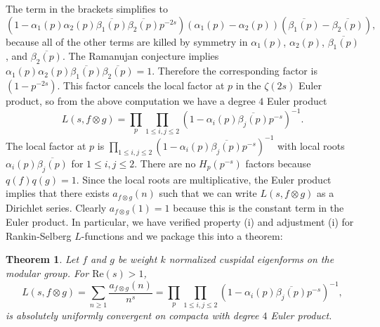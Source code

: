 \documentclass[12pt]{book}
\newtheorem{theorem}{Theorem}[section]
\theoremstyle{definition}\newframedtheorem{method}{Method}
\renewcommand{\a}{\alpha}
\renewcommand{\b}{\beta}
\newcommand{\z}{\zeta}
\newcommand{\ox}{\otimes}
\newcommand{\<}{\langle}
\renewcommand{\>}{\rangle}
\newcommand{\conj}{\overline}
\renewcommand{\Re}{\mathrm{Re}}
\begin{document}
      \endgroup
      The term in the brackets simplifies to
      \[
        (1-\a_{1}(p)\a_{2}(p)\conj{\b_{1}(p)}\conj{\b_{2}(p)}p^{-2s})(\a_{1}(p)-\a_{2}(p))(\conj{\b_{1}(p)}-\conj{\b_{2}(p)}),
      \]
      because all of the other terms are killed by symmetry in $\a_{1}(p)$, $\a_{2}(p)$, $\conj{\b_{1}(p)}$, and $\conj{\b_{2}(p)}$. The Ramanujan conjecture implies $\a_{1}(p)\a_{2}(p)\conj{\b_{1}(p)}\conj{\b_{2}(p)} = 1$. Therefore the corresponding factor is $(1-p^{-2s})$. This factor cancels the local factor at $p$ in the $\z(2s)$ Euler product, so from the above computation we have a degree $4$ Euler product
      \[
        L(s,f \ox g) = \prod_{p}\prod_{1 \le i,j \le 2}(1-\a_{i}(p)\conj{\b_{j}(p)}p^{-s})^{-1}.
      \]
      The local factor at $p$ is $\prod_{1 \le i,j \le 2}(1-\a_{i}(p)\conj{\b_{j}(p)}p^{-s})^{-1}$ with local roots $\a_{i}(p)\conj{\b_{j}(p)}$ for $1 \le i,j \le 2$. There are no $H_{p}(p^{-s})$ factors because $q(f)q(g) = 1$. Since the local roots are multiplicative, the Euler product implies that there exists $a_{f \ox g}(n)$ such that we can write $L(s,f \ox g)$ as a Dirichlet series. Clearly $a_{f \ox g}(1) = 1$ because this is the constant term in the Euler product. In particular, we have verified property (i) and adjustment (i) for Rankin-Selberg $L$-functions and we package this into a theorem:

      \begin{theorem}
        Let $f$ and $g$ be weight $k$ normalized cuspidal eigenforms on the modular group. For $\Re(s) > 1$,
        \[
          L(s,f \ox g) = \sum_{n \ge 1}\frac{a_{f \ox g}(n)}{n^{s}} = \prod_{p}\prod_{1 \le i,j \le 2}(1-\a_{i}(p)\conj{\b_{j}(p)}p^{-s})^{-1},
        \]
        is absolutely uniformly convergent on compacta with degree $4$ Euler product.
      \end{theorem}
\end{document}
